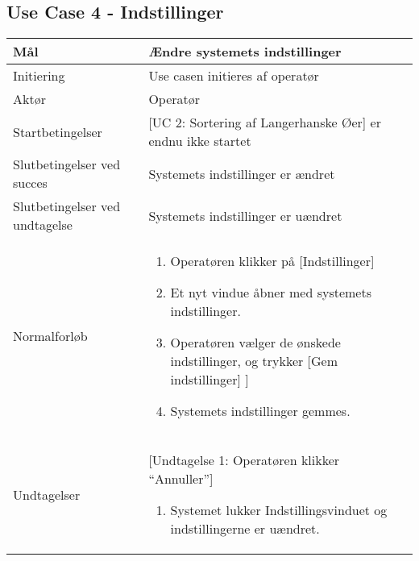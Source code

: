 \subsection{Use Case 4 - Indstillinger}
\begin{center}
		\begin{longtable}{ | m{4cm} | m{8cm}| } 
			\hline
			Mål & Ændre systemets indstillinger \\ 
			\hline
			Initiering &  Use casen initieres af operatør\\
			\hline
			Aktør & Operatør \\ 
			\hline
			Startbetingelser & [UC 2: Sortering af Langerhanske Øer] er endnu ikke startet\\ 
			\hline	
			Slutbetingelser ved succes & Systemets indstillinger er ændret \\
			\hline
			Slutbetingelser ved undtagelse & Systemets indstillinger er uændret \\
			\hline
			Normalforløb & \begin{enumerate}
				\setlength\itemsep{0cm} %
				\item Operatøren klikker på [Indstillinger]
				\item Et nyt vindue åbner med systemets indstillinger.
				\item Operatøren vælger de ønskede indstillinger, og trykker [Gem indstillinger]
				\subitem [Undtagelse 1: Operatøren klikker [Annuller]]
				\item Systemets indstillinger gemmes.
			\end{enumerate} \\ 
			\hline
			Undtagelser & [Undtagelse 1: Operatøren klikker “Annuller”]
			
			\begin{enumerate}
			\item Systemet lukker Indstillingsvinduet og indstillingerne er uændret.
			\end{enumerate} \\
			\hline
		\end{longtable}
		
	\end{center}
	\pagebreak
